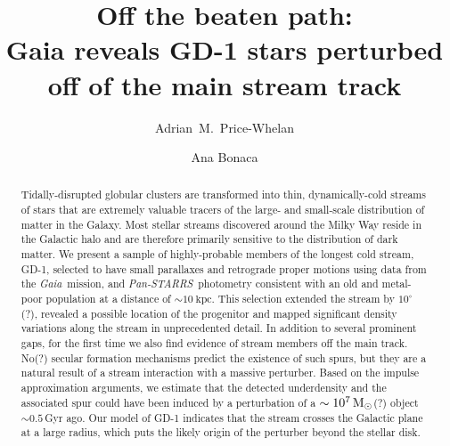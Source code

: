 \documentclass[modern]{aastex62}
\newcommand{\gaia}{\textsl{Gaia}}
\newcommand{\pans}{\textsl{Pan-STARRS}}
\newcommand{\kpc}{\textrm{kpc}}
\begin{document}
\sloppy\sloppypar\raggedbottom\frenchspacing %

\title{Off the beaten path: \\
       Gaia reveals GD-1 stars perturbed off of the main stream track}

\author[0000-0003-0872-7098]{Adrian~M.~Price-Whelan}

\author[0000-0002-7846-9787]{Ana Bonaca}

\begin{abstract}\noindent %
Tidally-disrupted globular clusters are transformed into thin, dynamically-cold
streams of stars that are extremely valuable tracers of the large- and
small-scale distribution of matter in the Galaxy.
Most stellar streams discovered around the Milky Way reside in the Galactic halo
and are therefore primarily sensitive to the distribution of dark matter.
We present a sample of highly-probable members of the longest cold stream, GD-1,
selected to have small parallaxes and retrograde proper motions using data from
the \gaia\ mission, and \pans\ photometry consistent with an old and metal-poor
population at a distance of $\sim10~\kpc$.
This selection extended the stream by $10^\circ$(?), revealed a possible location of the progenitor and mapped significant density variations along the stream in unprecedented detail.
In addition to several prominent gaps, for the first time we also find evidence of stream members off the main track.
No(?) secular formation mechanisms predict the existence of such spurs, but they are a natural result of a stream interaction with a massive perturber.
Based on the impulse approximation arguments, we estimate that the detected underdensity and the associated spur could have been induced by a perturbation of a $\sim10^7\,\rm M_\odot$(?) object $\sim 0.5\,$Gyr ago.
Our model of GD-1 indicates that the stream crosses the Galactic plane at a large radius, which puts the likely origin of the perturber beyond the stellar disk.
\end{abstract}

\end{document}
